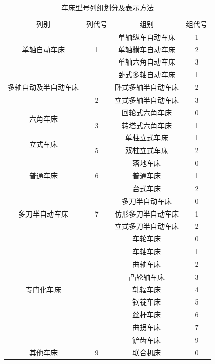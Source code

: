 \documentclass{ctexbook}
\begin{document}
\begin{table}[htbp]
	\centering
	\caption{车床型号列组划分及表示方法}
	\begin{tabular}{cccc}
		列别    & 列代号   & 组别    & 组代号 \\
		\multirow{3}[0]{*}{单轴自动车床} &       & 单轴纵车自动车床 & 1 \\
		& 1     & 单轴横车自动车床 & 2 \\
		&       & 单轴六角自动车床 & 3 \\
		\multirow{3}[0]{*}{多轴自动及半自动车床} &       & 卧式多轴自动车床 & 1 \\
		&       & 卧式多轴半自动车床 & 2 \\
		& 2     & 立式多轴半自动车床 & 3 \\
		\multirow{2}[0]{*}{六角车床} &       & 回轮式六角车床 & 0 \\
		& 3     & 转塔式六角车床 & 1 \\
		\multirow{2}[0]{*}{立式车床} &       & 单柱立式车床 & 1 \\
		& 5     & 双柱立式车床 & 2 \\
		\multirow{3}[0]{*}{普通车床} &       & 落地车床  & 0 \\
		& 6     & 普通车床  & 1 \\
		&       & 台式车床  & 2 \\
		\multirow{3}[0]{*}{多刀半自动车床} &       & 多刀半自动车床 & 0 \\
		& 7     & 仿形多刀半自动车床 & 1 \\
		&       & 立式多刀半自动车床 & 2 \\
		\multirow{9}[0]{*}{专门化车床} &       & 车轮车床  & 0 \\
		&       & 车轴车床  & 1 \\
		&       & 曲轴车床  & 2 \\
		&       & 凸轮轴车床 & 3 \\
		&       & 轧辐车床  & 4 \\
		&       & 钢锭车床  & 5 \\
		&       & 丝杆车床  & 6 \\
		&       & 曲拐车床  & 7 \\
		&       & 铲齿车床  & 9 \\
		其他车床  & 9     & 联合机床  & 0 \\
	\end{tabular}%
	\label{tab:chechuangliezu}%
\end{table}%
\end{document}
